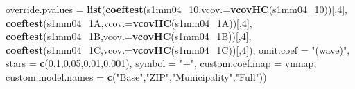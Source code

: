 \documentclass[
]{article}
\newenvironment{Shaded}{\begin{snugshade}}{\end{snugshade}}
\newcommand{\DataTypeTok}[1]{\textcolor[rgb]{0.13,0.29,0.53}{#1}}
\newcommand{\DecValTok}[1]{\textcolor[rgb]{0.00,0.00,0.81}{#1}}
\newcommand{\FloatTok}[1]{\textcolor[rgb]{0.00,0.00,0.81}{#1}}
\newcommand{\KeywordTok}[1]{\textcolor[rgb]{0.13,0.29,0.53}{\textbf{#1}}}
\newcommand{\NormalTok}[1]{#1}
\newcommand{\StringTok}[1]{\textcolor[rgb]{0.31,0.60,0.02}{#1}}
\begin{document}
\begin{Shaded}
\begin{Highlighting}[]
          \DataTypeTok{override.pvalues =} \KeywordTok{list}\NormalTok{(}\KeywordTok{coeftest}\NormalTok{(s1mm04_}\DecValTok{10}\NormalTok{,}\DataTypeTok{vcov.=}\KeywordTok{vcovHC}\NormalTok{(s1mm04_}\DecValTok{10}\NormalTok{))[,}\DecValTok{4}\NormalTok{],}
                                  \KeywordTok{coeftest}\NormalTok{(s1mm04_1A,}\DataTypeTok{vcov.=}\KeywordTok{vcovHC}\NormalTok{(s1mm04_1A))[,}\DecValTok{4}\NormalTok{],}
                                  \KeywordTok{coeftest}\NormalTok{(s1mm04_1B,}\DataTypeTok{vcov.=}\KeywordTok{vcovHC}\NormalTok{(s1mm04_1B))[,}\DecValTok{4}\NormalTok{],}
                                  \KeywordTok{coeftest}\NormalTok{(s1mm04_1C,}\DataTypeTok{vcov.=}\KeywordTok{vcovHC}\NormalTok{(s1mm04_1C))[,}\DecValTok{4}\NormalTok{]),}
          \DataTypeTok{omit.coef =} \StringTok{"(wave)"}\NormalTok{, }\DataTypeTok{stars =} \KeywordTok{c}\NormalTok{(}\FloatTok{0.1}\NormalTok{,}\FloatTok{0.05}\NormalTok{,}\FloatTok{0.01}\NormalTok{,}\FloatTok{0.001}\NormalTok{), }\DataTypeTok{symbol =} \StringTok{"+"}\NormalTok{,}
          \DataTypeTok{custom.coef.map =}\NormalTok{ vnmap, }
          \DataTypeTok{custom.model.names =} \KeywordTok{c}\NormalTok{(}\StringTok{"Base"}\NormalTok{,}\StringTok{"ZIP"}\NormalTok{,}\StringTok{"Municipality"}\NormalTok{,}\StringTok{"Full"}\NormalTok{))}
\end{Highlighting}
\end{Shaded}
\end{document}

